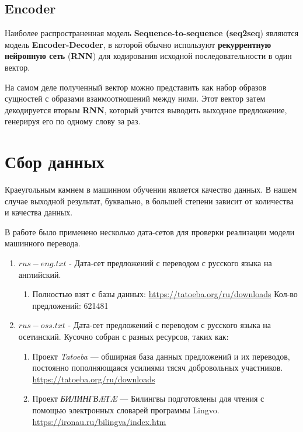 \documentclass[a4paper,russian]{article}
\begin{document}
	\subsection{Encoder}
	
	
	Наиболее распространенная модель \textbf{Sequence-to-sequence (seq2seq}) являются модель \textbf{Encoder-Decoder}, в которой обычно используют \textbf{рекуррентную нейронную сеть} (\textbf{RNN}) для кодирования исходной последовательности в один вектор.
	
	На самом деле полученный вектор можно представить как набор образов сущностей с образами взаимоотношений между ними. Этот вектор затем декодируется вторым \textbf{RNN}, который учится выводить выходное предложение, генерируя его по одному слову за раз.
	
	\clearpage
	
	\section{Сбор данных}
	
	Краеугольным камнем в машинном обучении является качество данных. В нашем случае выходной результат, буквально, в большей степени зависит от количества и качества данных.
	
	В работе было применено несколько дата-сетов для проверки реализации модели машинного перевода.
	
	\begin{enumerate}
		\item $rus-eng.txt$ - Дата-сет предложений с переводом с русского языка на английский.
		\begin{enumerate}
			\item Полностью взят с базы данных: \url{https://tatoeba.org/ru/downloads} Кол-во предложений: 621481
		\end{enumerate}
		\item $rus-oss.txt$ - Дата-сет предложений с переводом с русского языка на осетинский.
		Кусочно собран с разных ресурсов, таких как:
		\begin{enumerate}
			 \item Проект \textit{Tatoeba} — обширная база данных предложений и их переводов, постоянно пополняющаяся усилиями тясяч добровольных участников. \url{https://tatoeba.org/ru/downloads}
			 \item Проект \textit{БИЛИНГВÆТÆ} — Билингвы подготовлены для чтения с помощью электронных словарей программы Lingvo. \url{https://ironau.ru/bilingva/index.htm}
 		\end{enumerate}
	\end{enumerate}
\end{document}
